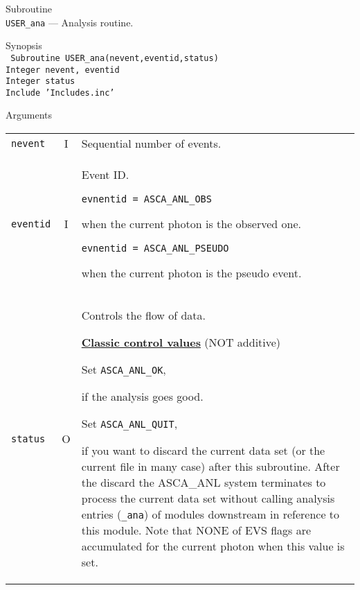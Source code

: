 \vspace{1cm}

\newpage
\begin{description}
\item{Subroutine}\\
   {\tt USER\_ana} --- Analysis routine.
\item{Synopsis}\\
   {\tt
      Subroutine USER\_ana(nevent,eventid,status) \\
      Integer nevent, eventid \\
      Integer status \\
      Include 'Includes.inc'
   }
\item{Arguments} \\
 \begin{tabular}{l@{\ (}c@{)\ }p{}}
   {\tt nevent} & I & Sequential number of events.\\
   {\tt eventid} & I & Event ID.\par
        {\tt evnentid = ASCA\_ANL\_OBS}\par
        \hfill\parbox{0.65\textwidth}{
             when the current photon is the observed one.
        }\par
        {\tt evnentid = ASCA\_ANL\_PSEUDO}\par
        \hfill\parbox{0.65\textwidth}{
             when the current photon is the pseudo event.
        }\par\\
   {\tt status} & O & Controls the flow of data.\par
        \medskip
        \underline{\bf Classic control values} (NOT additive) \par
        Set {\tt ASCA\_ANL\_OK},\par
        \hfill\parbox{0.65\textwidth}{
            if the analysis goes good.
        }\par
        Set {\tt ASCA\_ANL\_QUIT},\par
        \hfill\parbox{0.65\textwidth}{
            if you want to discard the current data set (or the current file
            in many case) after this subroutine.
            After the discard
            the ASCA\_ANL system terminates to process the current data set
            without calling analysis entries ({\tt *\_ana}) of modules 
            downstream in reference to this module.
            Note that NONE of EVS flags are accumulated for the current photon
            when this value is set.
        }\par

\end{tabular}
\end{description}
